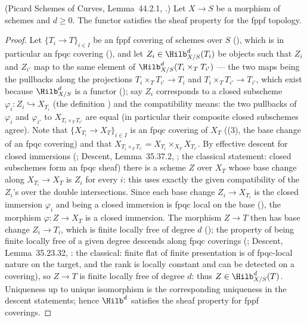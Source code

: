 \begin{lemma}\label{lem:pc-hilb-sheaf}
(Picard Schemes of Curves, Lemma~44.2.1,
.)  Let $X\to S$ be
a morphism of schemes and $d\geq0$.  The functor
 satisfies the sheaf
property for the fppf topology.
\end{lemma}
\begin{proof}
Let $\{T_i\to T\}_{i\in I}$ be an fppf covering of schemes over $S$
(), which is in particular an fpqc covering
(), and let
$Z_i\in\Hilb^d_{X/S}(T_i)$ be objects such that $Z_i$ and $Z_{i'}$ map to the same element of
$\Hilb^d_{X/S}(T_i\times_TT_{i'})$ --- the two maps being the pullbacks
along the projections $T_i\times_TT_{i'}\to T_i$ and
$T_i\times_TT_{i'}\to T_{i'}$, which exist because $\Hilb^d_{X/S}$ is a
functor (); say $Z_i$ corresponds to a closed
subscheme $\varphi_i:Z_i\hookrightarrow X_{T_i}$ (the definition
) and the compatibility means: the two
pullbacks of $\varphi_i$ and $\varphi_{i'}$ to
$X_{T_i\times_TT_{i'}}$ are equal (in particular their composite
closed subschemes agree).  Note that
$\{X_{T_i}\to X_T\}_{i\in I}$ is an fpqc covering of $X_T$
((3), the base change of an fpqc
covering) and that
$X_{T_i\times_TT_{i'}}=X_{T_i}\times_{X_T}X_{T_{i'}}$.  By effective
descent for closed immersions
(; Descent, Lemma~35.37.2,
; the classical
statement: closed subschemes form an fpqc sheaf) there is a scheme
$Z$ over $X_T$ whose base change along $X_{T_i}\to X_T$ is $Z_i$ for
every $i$: this uses exactly the given compatibility of the $Z_i$'s
over the double intersections.  Since each base change
$Z_i\to X_{T_i}$ is the closed immersion $\varphi_i$ and being a closed
immersion is fpqc local on the base
(), the morphism
$\varphi:Z\to X_T$ is a closed immersion.
The morphism $Z\to T$ then has base change $Z_i\to T_i$, which is
finite locally free of degree $d$ ();
the property of being finite locally free of a given degree descends
along fpqc coverings (;
Descent, Lemma~35.23.32,
: the
classical: finite flat of finite presentation is of fpqc-local nature
on the target, and the rank is locally constant and can be detected
on a covering), so $Z\to T$ is finite locally free of degree $d$: thus
$Z\in\Hilb^d_{X/S}(T)$.  Uniqueness up to unique isomorphism is the
corresponding uniqueness in the descent statements; hence $\Hilb^d$
satisfies the sheaf property for fppf coverings.
\end{proof}

